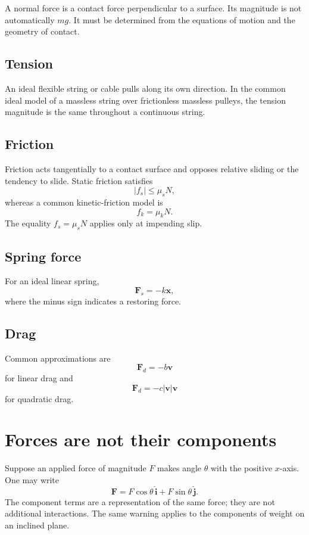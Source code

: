 A normal force is a contact force perpendicular to a surface.  Its magnitude is not automatically
$mg$.  It must be determined from the equations of motion and the geometry of contact.

\subsection*{Tension}

An ideal flexible string or cable pulls along its own direction.  In the common ideal model of a
massless string over frictionless massless pulleys, the tension magnitude is the same throughout a
continuous string.

\subsection*{Friction}

Friction acts tangentially to a contact surface and opposes relative sliding or the tendency to
slide.  Static friction satisfies
\[
|f_s|\leq \mu_sN,
\]
whereas a common kinetic-friction model is
\[
f_k=\mu_kN.
\]
The equality $f_s=\mu_sN$ applies only at impending slip.

\subsection*{Spring force}

For an ideal linear spring,
\[
\mathbf F_s=-k\mathbf x,
\]
where the minus sign indicates a restoring force.

\subsection*{Drag}

Common approximations are
\[
\mathbf F_d=-b\mathbf v
\]
for linear drag and
\[
\mathbf F_d=-c|\mathbf v|\mathbf v
\]
for quadratic drag.

\section{Forces are not their components}

Suppose an applied force of magnitude $F$ makes angle $\theta$ with the positive $x$-axis.  One may
write
\[
\mathbf F=F\cos\theta\,\hat{\mathbf i}+F\sin\theta\,\hat{\mathbf j}.
\]
The component terms are a representation of the same force; they are not additional interactions.
The same warning applies to the components of weight on an inclined plane.

